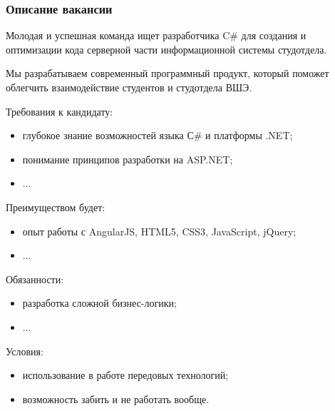 \documentclass{../../slides-style}
\begin{document}
    \begin{frame}
        \frametitle{Описание вакансии}
        \begin{scriptsize}
            Молодая и успешная команда ищет разработчика C\# для создания и оптимизации кода серверной части информационной системы студотдела.

            Мы разрабатываем современный программный продукт, который поможет облегчить взаимодействие студентов и студотдела ВШЭ.

            Требования к кандидату:
            \begin{itemize}
                \item глубокое знание возможностей языка С\# и платформы .NET;
                \item понимание принципов разработки на ASP.NET;
                \item ...
            \end{itemize}

            Преимуществом будет:
            \begin{itemize}
                \item опыт работы с AngularJS, HTML5, CSS3, JavaScript, jQuery;
                \item ...
            \end{itemize}

            Обязанности:
            \begin{itemize}
                \item разработка сложной бизнес-логики;
                \item ...
            \end{itemize}

            Условия:
            \begin{itemize}
                \item использование в работе передовых технологий;
                \item возможность забить и не работать вообще.
            \end{itemize}
        \end{scriptsize}
    \end{frame}
\end{document}
